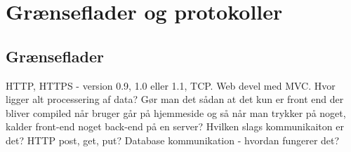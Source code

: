 \chapter{Grænseflader og protokoller}
\section{Grænseflader}
HTTP, HTTPS - version 0.9, 1.0 eller 1.1, TCP. Web devel med MVC. Hvor ligger alt processering af data? Gør man det sådan at det kun er front end der bliver compiled når bruger går på hjemmeside og så når man trykker på noget, kalder front-end noget back-end på en server? Hvilken slags kommunikaiton er det? HTTP post, get, put? Database kommunikation - hvordan fungerer det?